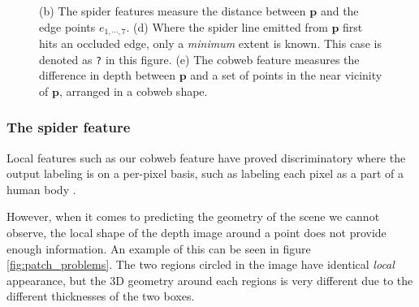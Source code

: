 \documentclass[10pt,twocolumn,letterpaper]{article}
\newcommand{\point}{\mathbf{p}}
\newcommand{\note}[1]{\textcolor{blue}{NOTE: #1}}
\begin{document}
\begin{figure}[tb]
        \hfill
        \hfill
    \caption{
    (b) The spider features measure the distance between $\point$ and the edge points $e_{1, \cdots, 7}$.
    (d) Where the spider line emitted from $\point$ first hits an occluded edge, only a \textit{minimum} extent is known.
    This case is denoted as \texttt{?} in this figure.
    (e) The cobweb feature measures the difference in depth between $\point$ and a set of points in the near vicinity of $\point$, arranged in a cobweb shape.}%
    \label{fig:features}
\end{figure}


\subsubsection{The spider feature}

Local features such as our cobweb feature have proved discriminatory where the output labeling is on a per-pixel basis, such as labeling each pixel as a part of a human body \cite{shotton-cvpr-2011}.

However, when it comes to predicting the geometry of the scene we cannot observe, the local shape of the depth image around a point does not provide enough information. 
An example of this can be seen in figure \ref{fig:patch_problems}.
The two regions circled in the image have identical \emph{local} appearance, but the 3D geometry around each regions is very different due to the different thicknesses of the two boxes.
\end{document}
